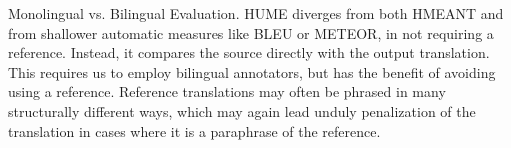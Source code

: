 \documentclass[11pt,letterpaper]{article}
\makeatletter
\renewcommand{\paragraph}{
  \@startsection{paragraph}{4}
  {\z@}{.1ex \@plus .1ex \@minus .1ex}{-1.5em}
  {\normalfont\normalsize\bfseries}
}
\newcommand{\com}[1]{}
\newcommand{\oa}[1]{}
\newcommand{\bh}[1]{\footnote{\color{blue}BH: #1}}
\makeatother
\begin{document}



\paragraph{Monolingual vs. Bilingual Evaluation.}
\label{src-vs-ref}
HUME diverges from both HMEANT and from shallower automatic measures
like BLEU or METEOR, in not requiring a reference.
Instead, it compares the source directly with the output translation.
This requires us to employ bilingual annotators, but has the benefit of avoiding
using a reference. Reference translations may often be phrased in many structurally different
ways, which may again lead unduly penalization of the translation in cases where
it is a paraphrase of the reference.




\com{
\paragraph{Error Localisation.}
In HMEANT, an error in a child node often results in the parent node
being penalised as well. This makes it harder to quantify the true scale of  
the original error, as its effect gets propagated up the tree. 
In HUME, errors are localised as much as possible to where they occur,
by the separation of atomic and structural units,
which supports a more accurate aggregation of the translation errors
to a composite score.
}
\oa{Omitted point here}

\end{document}
